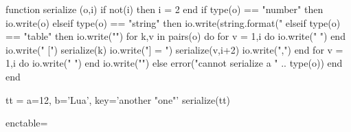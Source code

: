 \documentclass{article}
\begin{document}
\begin{luacode*}


    function serialize (o,i)
      if not(i) then i = 2 end
      if type(o) == "number" then
        io.write(o)
      elseif type(o) == "string" then
        io.write(string.format("%
      elseif type(o) == "table" then
        io.write("{\n")
        for k,v in pairs(o) do
          for v = 1,i do
            io.write(" ")
          end
          io.write("  [")
          serialize(k)
          io.write("] = ")
          serialize(v,i+2)
          io.write(",\n")
        end
          for v = 1,i do
            io.write(" ")
          end
        io.write("}\n")
      else
        error("cannot serialize a " .. type(o))
      end
    end

    
  tt = {a=12, b='Lua', key='another "one"'}
  serialize(tt)
  
  
  enctable={}
  
\end{luacode*}

\def\ReadDeclareTextSymbol#1#2#3{%
  \luaprocess
    {\luastring{\unexpanded{#1}}}
    {\luastring{#2}}
    {#3}{symbol}
}
\def\ReadDeclareTextAccent#1#2#3{%
  \luaprocess
    {\luastring{\unexpanded{#1}}}
    {\luastring{#2}}
    {#3}{accent}
}
\def\ReadDeclareTextComposite#1#2#3#4{%
  \luaprocess
    {\luastring{\unexpanded{#1#3}}}
    {\luastring{#2}}
    {#4}{composite}
}
\def\ReadDeclareTextDoubleComposite#1#2#3#4#5{%
  \luaprocess
    {\luastring{\unexpanded{#1#3#4}}}
    {\luastring{#2}}
    {#5}{composite-dbl}
}
\DeclareDocumentCommand{}
\DeclareDocumentCommand{}
\def\luaprocess#1#2#3#4{%
  \directlua{
    if not( enctable[#1] ) then
      enctable[#1] = {}
    end
    enctable[#1][#2] = \number#3
  }
}


\begingroup
\makeatletter
\let\DeclareTextCommand\ReadDeclareTextCommand
\let\DeclareTextSymbol\ReadDeclareTextSymbol
\let\DeclareTextAccent\ReadDeclareTextAccent
\let\DeclareTextComposite\ReadDeclareTextComposite
\let\DeclareTextDoubleComposite\ReadDeclareTextDoubleComposite
\let\DeclareTextCompositeCommand\ReadDeclareTextCompositeCommand
\def\DeclareErrorFont#1#2#3#4#5{}
\def\DeclareFontEncoding#1#2#3{%
  \def\LastDeclaredEncoding{#1}%
}
\def\DeclareFontSubstitution#1#2#3#4{}
\def\DeclareTextSymbolDefault#1#2{}
\def\NeedsTeXFormat#1[#2]{}










    
\end{document}
